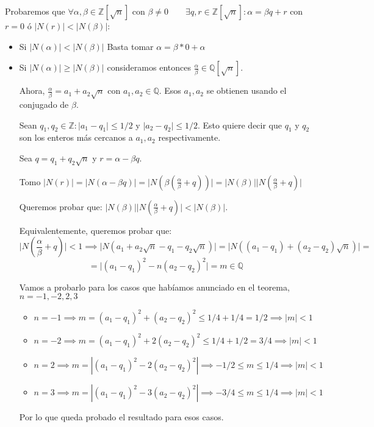 \documentclass[11pt, a4paper, titlepage]{article}
\makeatletter
\renewenvironment{proof}[1][\proofname] {\vspace{-15pt}\par\pushQED{\qed}\normalfont\topsep6\p@\@plus6\p@\relax\trivlist\item[\hskip\labelsep\it#1\@addpunct{.}]\ignorespaces}{\popQED\endtrivlist\@endpefalse}
\providecommand{\ent}{\mathbb{Z}}
\providecommand{\rac}{\mathbb{Q}}
\providecommand{\abs}[1]{\lvert#1\rvert}
\theoremstyle{theorem-style}
\theoremstyle{definition-style}
\theoremstyle{remark-style}
\theoremstyle{example-style}
\makeatother
\begin{document}
\begin{proof}
	Probaremos que $\forall \alpha, \beta \in \ent[\sqrt{n}]$ con $\beta \neq 0 \quad \quad \exists q,r \in \ent[\sqrt{n}] : \alpha = \beta q + r$ con $r=0$ ó $\abs{N(r)} < \abs{N(\beta)}$:
	
	\begin{itemize}
	\item Si $\abs{N(\alpha)} < \abs{N(\beta)}$ Basta tomar $\alpha  =  \beta * 0 + \alpha$
	
	\item Si $\abs{N(\alpha)} \geq \abs{N(\beta)}$ consideramos entonces  $\frac{\alpha}{\beta} \in \rac[\sqrt{n}]$.
	
	Ahora, $\frac{\alpha}{\beta} = a_1 + a_2\sqrt{n}$ con $a_1, a_2 \in \rac $. Esos $a_1,a_2$ se obtienen usando el conjugado de $\beta$.
	
	Sean $q_1,q_2 \in \ent : \abs{a_1-q_1}\leq 1/2$ y $\abs{a_2-q_2}\leq 1/2$. Esto quiere decir que $q_1$ y $q_2$ son los enteros más cercanos a $a_1,a_2$ respectivamente.
	
	Sea $q=q_1+q_2\sqrt{n}$  y $r = \alpha - \beta q$.
	
	Tomo $\abs{N(r)} = \abs{N(\alpha - \beta q)} = \abs{N(\beta(\frac{\alpha}{\beta}+ q))} = \abs{N(\beta)}\abs{N(\frac{\alpha}{\beta}+ q)}$
	
	Queremos probar que: $\abs{N(\beta)}\abs{N(\frac{\alpha}{\beta}+ q)} < \abs{N(\beta)}$.
	
	Equivalentemente, queremos probar que:
	\[
	  \abs{N(\frac{\alpha}{\beta}+ q)} < 1 \implies \abs{N(a_1+a_2\sqrt{n}-q_1 -q_2\sqrt{n})} = \abs{N((a_1-q_1) + (a_2-q_2)\sqrt{n})} = \]
	  \[
	 = \abs{(a_1-q_1)^2 - n(a_2-q_2)^2} = m \in \rac
	 \]
	 
Vamos a probarlo para los casos que habíamos anunciado en el teorema, $n = -1,-2,2,3$

\begin{itemize}
	\item $n=-1 \implies m= (a_1-q_1)^2 +(a_2-q_2)^2 \leq 1/4 + 1/4 = 1/2 \implies \abs{m} < 1$
	
	\item $n=-2 \implies m = (a_1-q_1)^2 +2(a_2-q_2)^2 \leq 1/4 + 1/2 = 3/4 \implies \abs{m} < 1$
	
	\item $n=2 \implies m = |(a_1-q_1)^2 -2(a_2-q_2)^2 |\implies -1/2 \leq m \leq 1/4 \implies \abs{m} < 1$
	
	\item $n=3 \implies m = |(a_1-q_1)^2 -3(a_2-q_2)^2| \implies -3/4 \leq m \leq 1/4 \implies \abs{m} < 1$
\end{itemize}

Por lo que queda probado el resultado para esos casos.
	
\end{itemize} 
\end{proof}
\end{document}
